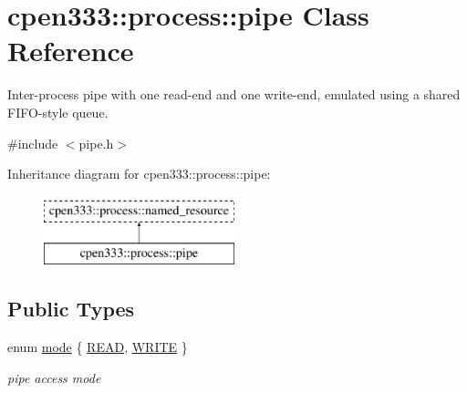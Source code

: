 \hypertarget{classcpen333_1_1process_1_1pipe}{}\section{cpen333\+:\+:process\+:\+:pipe Class Reference}
\label{classcpen333_1_1process_1_1pipe}


Inter-\/process pipe with one read-\/end and one write-\/end, emulated using a shared F\+I\+F\+O-\/style queue.  




{\ttfamily \#include $<$pipe.\+h$>$}

Inheritance diagram for cpen333\+:\+:process\+:\+:pipe\+:\begin{figure}[H]
\begin{center}
\leavevmode
\includegraphics[height=2.000000cm]{classcpen333_1_1process_1_1pipe}
\end{center}
\end{figure}
\subsection*{Public Types}
\begin{DoxyCompactItemize}
\item 
enum \hyperlink{classcpen333_1_1process_1_1pipe_a80047f44ba5638538b032efa851c6f3c}{mode} \{ \hyperlink{classcpen333_1_1process_1_1pipe_a80047f44ba5638538b032efa851c6f3ca683aa54088bc99c7fe5143db2db483fb}{R\+E\+AD}, 
\hyperlink{classcpen333_1_1process_1_1pipe_a80047f44ba5638538b032efa851c6f3caf7d3bc474155ae5295e3b8f0873e83fe}{W\+R\+I\+TE}
 \}\begin{DoxyCompactList}\small\item\em pipe access mode \end{DoxyCompactList}
\end{DoxyCompactItemize}
